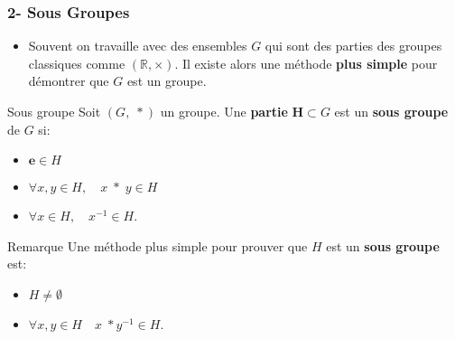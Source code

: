 \documentclass{beamer}
\begin{document}
\begin{frame}[t]
  \frametitle{2- Sous Groupes}
  \begin{itemize}
    \scriptsize
    \item Souvent on travaille avec des ensembles $G$ qui sont des parties des
      groupes classiques comme $\left(\mathbb{R}, \times\right)$. Il existe
      alors une méthode \alert{\textbf{plus simple}} pour démontrer que $G$ est un groupe.
  \end{itemize}
\pause
  \begin{block}{Sous groupe}
    \small
    Soit $\left(G,\; *\right)$ un groupe. Une \textbf{partie}
    $\mathbf{H}\subset G$ est un \textbf{\alert{sous groupe}} de $G$
    si:

    \centering
    \begin{itemize}
      \item $\mathbf{e} \in H$\\[8pt]
      \item $\forall x, y \in H,\quad x\;*\;y \in H$\\[8pt]
      \item $\forall x\in H,\quad x^{-1}\in H$.
    \end{itemize}

  \end{block}
  \pause
  \begin{block}{Remarque}
   Une méthode plus simple pour prouver que $H$ est un \textbf{sous groupe} est:
   \begin{itemize}
     \item $H \neq \emptyset$
     \item $\forall x, y \in H\quad x\;*y^{-1} \in H$.
   \end{itemize}
  \end{block}
\end{frame}
\end{document}
